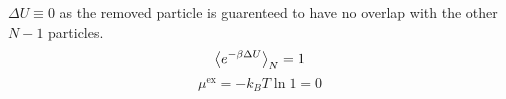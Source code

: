 \documentclass{article}
\begin{document}
\begin{enumerate}
\begin{itemize}
            $\Delta U\equiv 0$ as the removed particle is guarenteed to have no overlap with the other $N-1$ particles.
            $$\expval{e^{-\beta\Delta U}}_N=1$$
            $$\mu^{\text{ex}}=-k_BT\ln 1=0$$
        \end{itemize}
    \end{enumerate}
\end{document}
